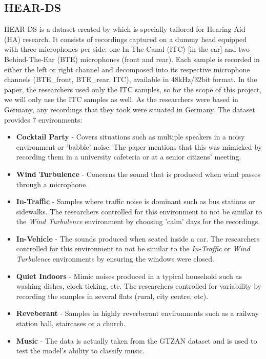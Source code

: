 \documentclass[logo,bsc,singlespacing,parskip,online]{infthesis}
\begin{document}
\subsection{HEAR-DS}
\label{sec:hear-ds}
HEAR-DS is a dataset created by \citet{Huwel2020HearDS} which is specially tailored for Hearing Aid (HA) research. 
It consists of recordings captured on a dummy head equipped with three microphones per side: one In-The-Canal (ITC) [in the ear] and two Behind-The-Ear (BTE) microphones (front and rear).
Each sample is recorded in either the left or right channel and decomposed into its respective microphone channels (BTE\_front, BTE\_rear, ITC), available in 48kHz/32bit format.
In the paper, the researchers used only the ITC samples, so for the scope of this project, we will only use the ITC samples as well. 
As the researchers were based in Germany, any recordings that they took were situated in Germany.
The dataset provides 7 environments:
\begin{itemize}
   \item \textbf{Cocktail Party} - Covers situations such as multiple speakers in a noisy environment or 'babble' noise. The paper mentions that this was mimicked by recording them in a university cafeteria or at a senior citizens' meeting.
   \item \textbf{Wind Turbulence} - Concerns the sound that is produced when wind passes through a microphone.
   \item \textbf{In-Traffic} - Samples where traffic noise is dominant such as bus stations or sidewalks. The researchers controlled for this environment to not be similar to the \textit{Wind Turbulence} environment by choosing 'calm' days for the recordings.
   \item \textbf{In-Vehicle} - The sounds produced when seated inside a car. The researchers controlled for this environment to not be similar to the \textit{In-Traffic} or \textit{Wind Turbulence} environments by ensuring the windows were closed. 
   \item \textbf{Quiet Indoors} - Mimic noises produced in a typical household such as washing dishes, clock ticking, etc. The researchers controlled for variability by recording the samples in several flats (rural, city centre, etc).
   \item \textbf{Reveberant} - Samples in highly reverberant environments such as a railway station hall, staircases or a church. 
   \item \textbf{Music} - The data is actually taken from the GTZAN dataset \cite{tzanetakis_musical_2002} and is used to test the model's ability to classify music.
\end{itemize}
\end{document}
